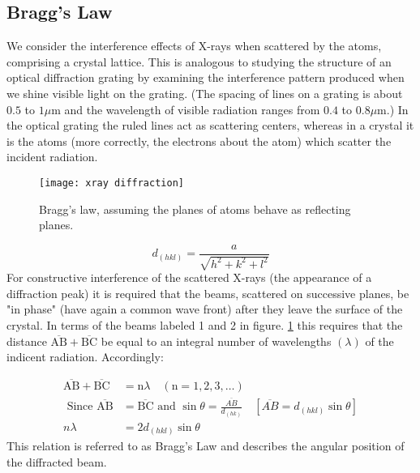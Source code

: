 \subsection{Bragg's Law}
We consider the interference effects of X-rays when scattered by the atoms, comprising a crystal lattice. This is analogous to studying the structure of an optical diffraction grating by examining the interference pattern produced when we shine visible light on the grating. (The spacing of lines on a grating is about $0.5$ to $1 \mu \mathrm{m}$ and the wavelength of visible radiation ranges from $0.4$ to $0.8 \mu \mathrm{m}$.) In the optical grating the ruled lines act as scattering centers, whereas in a crystal it is the atoms (more correctly, the electrons about the atom) which scatter the incident radiation.
\begin{figure}[H]
	\centering
	\texttt{[image: xray diffraction]}
	\caption{Bragg's law, assuming the planes of atoms behave as reflecting planes.}
	\label{Bragg's law}
\end{figure}
\begin{equation}
d_{(h k l)}=\frac{a}{\sqrt{h^{2}+k^{2}+l^{2}}}
\end{equation}
For constructive interference of the scattered X-rays (the appearance of a diffraction peak) it is required that the beams, scattered on successive planes, be "in phase" (have again a common wave front) after they leave the surface of the crystal. In terms of the beams labeled 1 and 2 in figure. \ref{Bragg's law} this requires that the distance $\overline{\mathrm{AB}}+\overline{\mathrm{BC}}$ be equal to an integral number of wavelengths $(\lambda)$ of the indicent radiation. Accordingly:

\begin{align}
\overline{\mathrm{AB}}+\overline{\mathrm{BC}}&=\mathrm{n} \lambda \quad(\mathrm{n}=1,2,3, \ldots) \\
\text { Since } \overline{\mathrm{AB}}&=\overline{\mathrm{BC}} \text { and } \sin \theta=\frac{\overline{A B}}{d_{(h k)}}\quad \left[\overline{A B}=d_{(h k l)} \sin \theta\right] \\
n \lambda&=2 d_{(h k l)} \sin \theta
\end{align}
This relation is referred to as Bragg’s Law and describes the angular position of the
diffracted beam.
